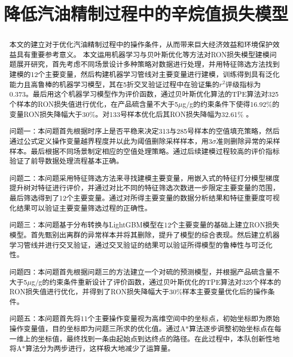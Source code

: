 \documentclass[bwprint]{gmcmthesis}
\title{降低汽油精制过程中的辛烷值损失模型}
\begin{document}
 \maketitle



\begin{abstract}
本文的建立对于优化汽油精制过程中的操作条件，从而带来巨大经济效益和环境保护效益具有重要参考意义。
本文运用机器学习与贝叶斯优化等方法对RON损失模型建模问题展开研究，首先考虑不同场景设计多种策略对数据进行处理，并用特征筛选方法找到建模的12个主要变量，然后构建机器学习管线对主要变量进行建模，训练得到具有泛化能力且高鲁棒的机器学习模型，其在5折交叉验证过程中在验证集的$r^2$评级指标为0.373。最后用这个机器学习模型作为评价函数，通过贝叶斯优化算法的TPE算法对325个样本的RON损失值进行优化，在产品硫含量不大于5$\mu$g/g的约束条件下使得16.92\%的变量RON损失降幅大于30\%。对133号样本优化后其RON损失降幅为32.61\% 。


问题一：本问题首先根据时序上是否平稳来决定313与285号样本的空值填充策略，然后通过公式定义操作变量越界程度并以此为阈值删除采样样本，用3$\sigma$准则删除异常的采样样本。最后根据不同场景制定相应的空值处理策略。通过后续建模过程较高的评价指标验证了前导数据处理流程基本正确。

问题二：本问题采用特征筛选方法来寻找建模主要变量，用嵌入式的特征打分模型梯度提升树对特征进行评价，并通过对比不同的特征筛选次数进一步限定主要变量的范围，最后筛选得到了12个主要变量。通过对所得主要变量的数据分析结果和特征重要度可视化结果可以验证主要变量筛选过程的正确性。

问题三：本问题基于分布转换与LightGBM模型在12个主要变量的基础上建立RON损失模型。首先甄别出离群的异常样本并将其删除，提升了模型的综合表现。然后建立机器学习管线并进行交叉验证，通过交叉验证的结果可以验证所得模型的鲁棒性与可泛化性。

问题四：本问题首先根据问题三的方法建立一个对硫的预测模型，并根据产品硫含量不大于5$\mu$g/g的约束条件重新设计了评价函数，通过贝叶斯优化的TPE算法对325个样本的RON损失值进行优化，并得到了RON损失降幅大于30\%样本主要变量优化后的操作条件。

问题五：本问题首先将11个主要操作变量视为高维空间中的坐标点，初始坐标即为原始操作变量值，目的坐标即为问题三所求的优化值。通过A*算法逐步调整初始坐标点在每一维上的坐标值，最终找到一条由起始点到达终点的路径。在此过程中，本队创新性地将A*算法分为两步进行，这样极大地减少了运算量。



\end{abstract}
\end{document}
